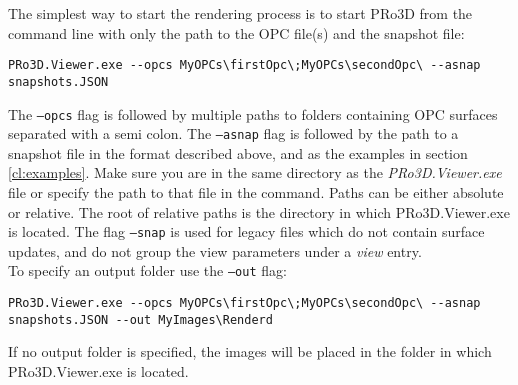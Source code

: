 The simplest way to start the rendering process is to start PRo3D from the command line with only the path to the OPC file(s) and the snapshot file:

\begin{lstlisting}
PRo3D.Viewer.exe --opcs MyOPCs\firstOpc\;MyOPCs\secondOpc\ --asnap snapshots.JSON
\end{lstlisting}

The \texttt{--opcs} flag is followed by multiple paths to folders containing OPC surfaces separated with a semi colon. The \texttt{--asnap} flag is followed by the path to a snapshot file in the format described above, and as the examples in section \ref{cl:examples}. Make sure you are in the same directory as the \emph{PRo3D.Viewer.exe} file or specify the path to that file in the command. Paths can be either absolute or relative. The root of relative paths is the directory in which PRo3D.Viewer.exe is located. The flag \texttt{--snap} is used for legacy files which do not contain surface updates, and do not group the view parameters under a \emph{view} entry.\\

To specify an output folder use the \texttt{--out} flag:

\begin{lstlisting}
PRo3D.Viewer.exe --opcs MyOPCs\firstOpc\;MyOPCs\secondOpc\ --asnap snapshots.JSON --out MyImages\Renderd
\end{lstlisting}

If no output folder is specified, the images will be placed in the folder in which PRo3D.Viewer.exe is located. 

